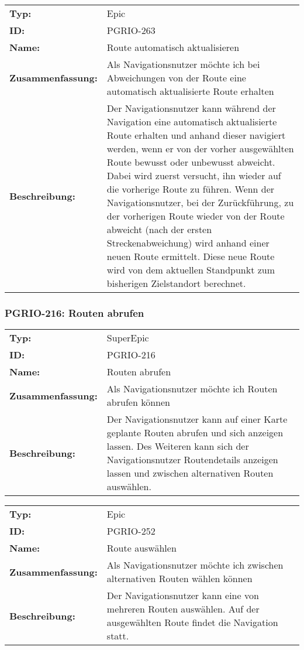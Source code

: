 		\begin{flushleft} 
\begin{tabular}{@{}lp{100mm}} 
\textbf{Typ:} & Epic \\ 
\textbf{ID:} & PGRIO-263 \\ 
\textbf{Name:} & Route automatisch aktualisieren \\ 
\textbf{Zusammenfassung:} & Als Navigationsnutzer möchte ich bei Abweichungen von der Route eine automatisch aktualisierte Route erhalten \\ 
\textbf{Beschreibung:} & Der Navigationsnutzer kann während der Navigation eine automatisch aktualisierte Route erhalten und anhand dieser navigiert werden, wenn er von der vorher ausgewählten Route bewusst oder unbewusst abweicht. Dabei wird zuerst versucht, ihn wieder auf die vorherige Route zu führen. Wenn der Navigationsnutzer, bei der Zurückführung, zu der vorherigen Route wieder von der Route abweicht (nach der ersten Streckenabweichung) wird anhand einer neuen Route ermittelt. Diese neue Route wird von dem aktuellen Standpunkt zum bisherigen Zielstandort berechnet. \\ 
\end{tabular} 
\end{flushleft} 

	\subsubsection{PGRIO-216: Routen abrufen} 
\begin{flushleft} 
\begin{tabular}{@{}lp{100mm}} 
\textbf{Typ:} & SuperEpic \\ 
\textbf{ID:} & PGRIO-216 \\ 
\textbf{Name:} & Routen abrufen \\ 
\textbf{Zusammenfassung:} & Als Navigationsnutzer möchte ich Routen abrufen können \\ 
\textbf{Beschreibung:} & Der Navigationsnutzer kann auf einer Karte geplante Routen abrufen und sich anzeigen lassen. Des Weiteren kann sich der Navigationsnutzer Routendetails anzeigen lassen und zwischen alternativen Routen auswählen. \\ 
\end{tabular} 
\end{flushleft} 

		\begin{flushleft} 
\begin{tabular}{@{}lp{100mm}} 
\textbf{Typ:} & Epic \\ 
\textbf{ID:} & PGRIO-252 \\ 
\textbf{Name:} & Route auswählen \\ 
\textbf{Zusammenfassung:} & Als Navigationsnutzer möchte ich zwischen alternativen Routen wählen können \\ 
\textbf{Beschreibung:} & Der Navigationsnutzer kann eine von mehreren Routen auswählen. Auf der ausgewählten Route findet die Navigation statt. \\ 
\end{tabular} 
\end{flushleft} 

